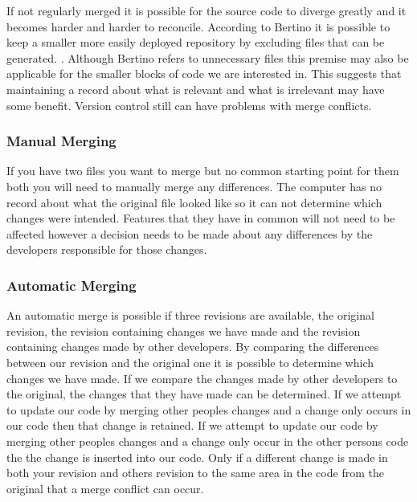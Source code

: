 If not regularly merged it is possible for the source code to diverge greatly and it becomes harder and harder to reconcile.
 According to Bertino it is possible to keep a smaller more easily deployed repository by excluding files that can be generated. \cite{Bertino2012}. Although Bertino refers to unnecessary files this premise may also be applicable for the smaller blocks of code we are interested in. This suggests that maintaining a record about what is relevant and what is irrelevant may have some benefit. Version control still can have problems with merge conflicts. 
 
\subsubsection{Manual Merging}
If you have two files you want to merge but no common starting point for them both you will need to manually merge any differences.  The computer has no record about what the original file looked like so it can not determine which changes were intended.  Features that they have in common will not need to be affected however a decision needs to be made about any differences by the developers responsible for those changes.


\subsubsection{Automatic Merging}
An automatic merge is possible if three revisions are available, the original revision, the revision containing changes we have made and the revision containing changes made by other developers. By comparing the differences between our revision and the original one it is possible to determine which changes we have made.  If we compare the changes made by other developers to the original, the changes that they have made can be determined.  If we attempt to update our code by merging other peoples changes and a change only occurs in our code then that change is retained.  If we attempt to update our code by merging other peoples changes and a change only occur in the other persons code the the change is inserted into our code. Only if a different change is made in both your revision and others revision to the same area in the code from the original that a merge conflict can occur. 


